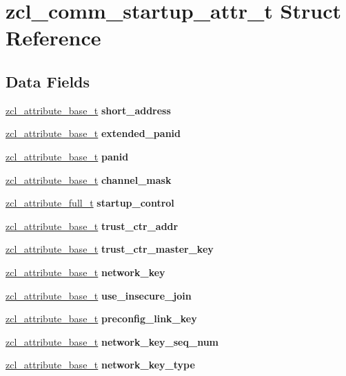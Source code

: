 \hypertarget{structzcl__comm__startup__attr__t}{}\section{zcl\+\_\+comm\+\_\+startup\+\_\+attr\+\_\+t Struct Reference}
\label{structzcl__comm__startup__attr__t}
\subsection*{Data Fields}
\begin{DoxyCompactItemize}
\item 
\hyperlink{structzcl__attribute__base__t}{zcl\+\_\+attribute\+\_\+base\+\_\+t} {\bfseries short\+\_\+address}
\item 
\hyperlink{structzcl__attribute__base__t}{zcl\+\_\+attribute\+\_\+base\+\_\+t} {\bfseries extended\+\_\+panid}
\item 
\hyperlink{structzcl__attribute__base__t}{zcl\+\_\+attribute\+\_\+base\+\_\+t} {\bfseries panid}
\item 
\hyperlink{structzcl__attribute__base__t}{zcl\+\_\+attribute\+\_\+base\+\_\+t} {\bfseries channel\+\_\+mask}
\item 
\hyperlink{structzcl__attribute__full__t}{zcl\+\_\+attribute\+\_\+full\+\_\+t} {\bfseries startup\+\_\+control}
\item 
\hyperlink{structzcl__attribute__base__t}{zcl\+\_\+attribute\+\_\+base\+\_\+t} {\bfseries trust\+\_\+ctr\+\_\+addr}
\item 
\hyperlink{structzcl__attribute__base__t}{zcl\+\_\+attribute\+\_\+base\+\_\+t} {\bfseries trust\+\_\+ctr\+\_\+master\+\_\+key}
\item 
\hyperlink{structzcl__attribute__base__t}{zcl\+\_\+attribute\+\_\+base\+\_\+t} {\bfseries network\+\_\+key}
\item 
\hyperlink{structzcl__attribute__base__t}{zcl\+\_\+attribute\+\_\+base\+\_\+t} {\bfseries use\+\_\+insecure\+\_\+join}
\item 
\hyperlink{structzcl__attribute__base__t}{zcl\+\_\+attribute\+\_\+base\+\_\+t} {\bfseries preconfig\+\_\+link\+\_\+key}
\item 
\hyperlink{structzcl__attribute__base__t}{zcl\+\_\+attribute\+\_\+base\+\_\+t} {\bfseries network\+\_\+key\+\_\+seq\+\_\+num}
\item 
\hyperlink{structzcl__attribute__base__t}{zcl\+\_\+attribute\+\_\+base\+\_\+t} {\bfseries network\+\_\+key\+\_\+type}

\end{DoxyCompactItemize}
